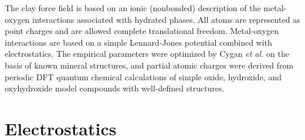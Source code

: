 \documentclass[]{book}
\begin{document}
The {\sc clay} force field is based on an ionic (nonbonded)
description of the metal-oxygen interactions associated with hydrated
phases. All atoms are represented as point charges and are allowed
complete translational freedom. Metal-oxygen interactions are based on
a simple Lennard-Jones potential combined with electrostatics. The
empirical parameters were optimized by Cygan {\it et
al.}\cite{Cygan04} on the basis of known mineral structures, and
partial atomic charges were derived from periodic DFT quantum chemical
calculations of simple oxide, hydroxide, and oxyhydroxide model
compounds with well-defined structures.


\section{\label{section:electrostatics}Electrostatics}
\end{document}
